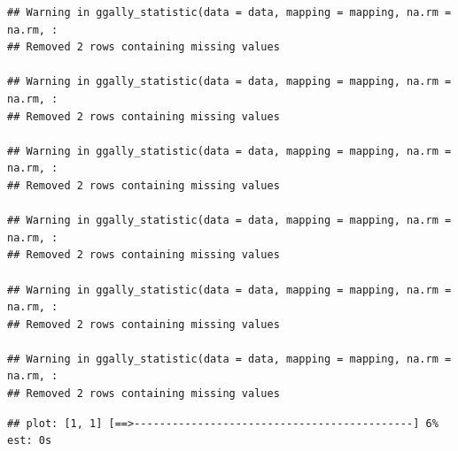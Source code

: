 \documentclass[
]{article}
\newenvironment{Shaded}{\begin{snugshade}}{\end{snugshade}}
\newcommand{\AttributeTok}[1]{\textcolor[rgb]{0.13,0.29,0.53}{#1}}
\newcommand{\DocumentationTok}[1]{\textcolor[rgb]{0.56,0.35,0.01}{\textbf{\textit{#1}}}}
\newcommand{\FunctionTok}[1]{\textcolor[rgb]{0.13,0.29,0.53}{\textbf{#1}}}
\newcommand{\NormalTok}[1]{#1}
\newcommand{\SpecialCharTok}[1]{\textcolor[rgb]{0.81,0.36,0.00}{\textbf{#1}}}
\newcommand{\StringTok}[1]{\textcolor[rgb]{0.31,0.60,0.02}{#1}}
\begin{document}
\begin{Shaded}
\end{Shaded}

\begin{verbatim}
## Warning in ggally_statistic(data = data, mapping = mapping, na.rm = na.rm, :
## Removed 2 rows containing missing values

## Warning in ggally_statistic(data = data, mapping = mapping, na.rm = na.rm, :
## Removed 2 rows containing missing values

## Warning in ggally_statistic(data = data, mapping = mapping, na.rm = na.rm, :
## Removed 2 rows containing missing values

## Warning in ggally_statistic(data = data, mapping = mapping, na.rm = na.rm, :
## Removed 2 rows containing missing values

## Warning in ggally_statistic(data = data, mapping = mapping, na.rm = na.rm, :
## Removed 2 rows containing missing values

## Warning in ggally_statistic(data = data, mapping = mapping, na.rm = na.rm, :
## Removed 2 rows containing missing values
\end{verbatim}

\begin{verbatim}
## plot: [1, 1] [==>--------------------------------------------] 6% est: 0s
\end{verbatim}
\end{document}
